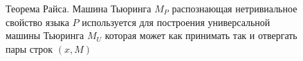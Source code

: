 \begin{figure}
\centering



\caption{Теорема Райса. Машина Тьюринга $M_P$ распознающая
  нетривиальное свойство языка $P$ используется для построения
  универсальной машины Тьюринга $M_U$ которая может как принимать так
  и отвергать пары строк $\left(x, M\right)$
} 
\label{figAddAlgoRiceTheorem}
\end{figure}
